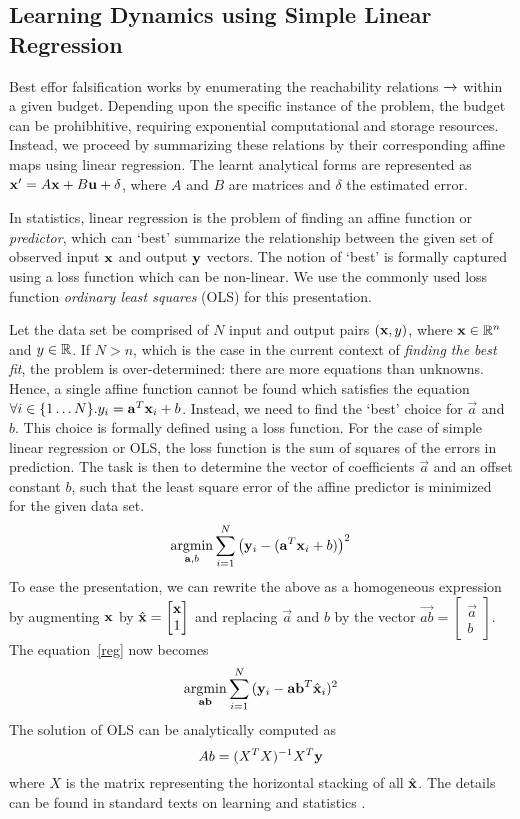 \subsection{Learning Dynamics using Simple Linear Regression}

Best effor falsification works by enumerating the reachability
relations $\xrightarrow{}$ within a given budget. Depending upon the
specific instance of the problem, the budget can be prohibhitive,
requiring exponential computational and storage resources. Instead, we
proceed by summarizing these relations by their corresponding affine
maps using linear regression. The learnt analytical forms are
represented as $\mathbf{x}' = A\mathbf{x} + B\mathbf{u} + \delta$, where $A$ and $B$ are
matrices and $\delta$ the estimated error.

In statistics, linear regression is the problem of finding an affine
function or \textit{predictor}, which can `best' summarize the
relationship between the given set of observed input $\mathbf{x}$ and output
$\mathbf{y}$ vectors. The notion of `best' is formally captured using a loss
function which can be non-linear. We use the commonly used loss
function \textit{ordinary least squares} (OLS) for this presentation.


Let the data set be comprised of $N$ input and output pairs $(\mathbf{x}, y)$,
where $\mathbf{x}\in\mathbb{R}^n$ and $y\in\mathbb{R}$. If $N>n$, which is the case in
the current context of \textit{finding the best fit}, the problem is
over-determined: there are more equations than unknowns. Hence, a
single affine function cannot be found which satisfies the equation
$\forall i\in\{1\ldots N\}. y_i = \mathbf{a}^T\mathbf{x}_i + b$. Instead, we need
to find the `best' choice for $\vec{a}$ and $b$. This choice is formally
defined using a loss function. For the case of simple linear
regression or OLS, the loss function is the sum of squares of the
errors in prediction.  The task is then to determine the vector of
coefficients $\vec{a}$ and an offset constant $b$, such that the least
square error of the affine predictor is minimized for the given data
set.
\begin{equation}
    \operatornamewithlimits{argmin}_{\vec{a}, b}\displaystyle\sum_{i=1}^{N}{\left(\y_i - (\vec{a}^T\x_i + b)\right)^2}
\label{reg}
\end{equation}
To ease the presentation, we can rewrite the above as a homogeneous
expression by augmenting $\mathbf{x}$ by $\hat{\mathbf{x}} = \begin{bmatrix}\mathbf{x} \\ 1\end{bmatrix}$ and replacing $\vec{a}$ and $b$ by the vector
$\vec{ab} = \begin{bmatrix}\vec{a} \\ b \end{bmatrix}$. The equation~\ref{reg} now becomes
\[
    \operatornamewithlimits{argmin}_{\vec{ab}}\displaystyle\sum_{i=1}^{N}{(\y_i - \vec{ab}^T \hat{\x}_i)^2}
\]
The solution of OLS can be analytically computed as
\[ Ab = (X^TX)^{-1}X^T\mathbf{y}\]
where $X$ is the matrix representing the horizontal stacking of all
$\hat{\mathbf{x}}$.
The details can be found in standard texts on learning and statistics
\cite{friedman2001elements}.

